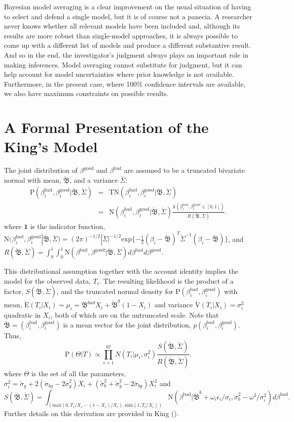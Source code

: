 \documentclass[11pt,titlepage]{article}
\newcommand{\bbeta}{{\mathfrak B}}
\newcommand{\bbetau}{\breve{\mathfrak B}}
\newcommand{\sigmau}{\breve{\sigma}}
\newcommand{\Sigmau}{\breve{\Sigma}}
\newcommand{\Eu}{\breve{\text{E}}}
\newcommand{\Vu}{\breve{\text{V}}}
\newcommand{\TN}{\text{TN}}
\newcommand{\N}{\text{N}}
\renewcommand{\P}{\text{P}}
\newcommand{\bb}{\beta^{\text{bad}}}
\newcommand{\bg}{\beta^{\text{good}}}
\begin{document}
Bayesian model averaging is a clear improvement on the usual situation
of having to select and defend a single model, but it is of course not
a panecia. A researcher never knows whether all relevant models have
been included and, although its results are more robust than
single-model approaches, it is always possible to come up with a
different list of models and produce a different substantive result.
And so in the end, the investigator's judgment always plays an
important role in making inferences.  Model averaging cannot
substitute for judgment, but it can help account for model
uncertainties where prior knowledge is not available. Furthermore, in
the present case, where 100\% confidence intervals are available, we
also have maximum constraints on possible results.

\appendix
\section{A Formal Presentation of the King's Model} \label{appx:king}

The joint distribution of $\bg$ and $\bb$ are assumed to be a
truncated bivariate normal with mean, $\bbetau$, and a variance
$\Sigmau$:
\begin{eqnarray}
\P(\bb_i, \bg_i | \bbetau, \Sigmau) & = & 
\TN (\bb_i,\bg_i | \bbetau, \Sigmau) \\
& = & \N (\bb_i, \bg_i | \bbetau, \Sigmau)
\frac{\mathbf{1}(\bb_i, \bg_i \in [0,1])}
{R(\bbetau, \Sigmau)}.
\end{eqnarray}
where $\mathbf{1}$ is the indicator function, $\N (\bb_i,
\bg_i | \bbetau, \Sigmau) = (2 \pi)^{-1/2} |\Sigmau|^{-1/2}
\text{exp} \{ - \frac{1}{2} (\beta_i-\bbetau)^T \Sigmau^{-1} (\beta_i
- \bbetau) \}$, and $R (\bbetau, \Sigmau) = \int_0^1 \int_0^1 \N
(\bb, \bg | \bbetau, \Sigmau) d\bb
d\bg$.

This distributional assumption together with the account identity
implies the model for the observed data, $T_i$. The resulting
likelihood is the product of a factor, $S(\bbetau, \Sigmau)$, and the
truncated normal density for $\P(\bb_i, \bg_i)$ with
mean, $\Eu(T_i|X_i) = \mu_i = \bbeta^{bad} X_i + \bbetau^g (1-X_i)$
and variance $\Vu(T_i|X_i) = \sigma^2_i$ quadratic in $X_i$, both of
which are on the untruncated scale. Note that $\bbetau=(\bb_i,
\bg_i)$ is a mean vector for the joint distribution,
$p(\bb_i, \bg_i)$. Thus,
\begin{equation}
\P(\Theta|T) \propto \prod_{i=1}^{67} N(T_i|\mu_i, \sigma_i^2)
\frac{S(\bbetau, \Sigmau)}{R(\bbetau, \Sigmau)}. \label{eq:likelihood}
\end{equation} 
where $\Theta$ is the set of all the parameters, $\sigma_i^2=\sigmau_g
+ 2(\sigmau_{bg} - 2 \sigmau_g^2) X_i + (\sigmau_b^2 + \sigmau_g^2 -
2\sigmau_{bg}) X_i^2$ and 
$$S(\bbetau, \Sigmau)=\int_{(\text{max}(0, T_i/X_i-(1-X_i)/X_i),
  \text{min}(1,T_i/X_i))} \N(\bb|\bbetau^b + \omega_i \epsilon_i /
\sigma_i, \sigmau^2_b-\omega^2/\sigma^2_i)d\bb .$$
Further details on
this derivation are provided in King (\citeyear[Ch.\ 7]{king:97}).
\end{document}
